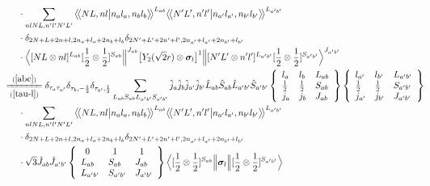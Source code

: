 \documentclass[master]{shnuthesis}
\newcommand{\llangle}{\big\langle\!\big\langle}
\newcommand{\rrangle}{\big\rangle\!\big\rangle}
\newcommand{\ap}{a^\prime}
\newcommand{\bp}{b^\prime}
\newcommand{\il}{\!\!\!\!\!\!\!\!\!\!}
\newcommand{\zdydh}{\xlongequal}
\begin{document}
\begin{align}
    & \cdot \sum_{nlNL,n^\prime l^\prime N^\prime L^\prime} \llangle N L, n l \big| n_{a} l_{a}, n_{b} l_{b} \rrangle^{L_{ab}} \llangle N^\prime L^\prime, n^\prime l^\prime \big| n_{a^\prime} l_{a^\prime}, n_{b^\prime} l_{b^\prime} \rrangle^{L_{\ap\bp}} \notag\\
    & \cdot \delta_{2N+L+2n+l,2n_a+l_a+2n_b+l_b}\delta_{2N^\prime+L^\prime+2n^\prime+l^\prime,2n_{a^\prime}+l_{a^\prime}+2n_{b^\prime}+l_{b^\prime}}  \notag\\
    & \cdot \Big\langle [N L \otimes n l]^{L_{ab}} [\frac{1}{2}\otimes\frac{1}{2}]^{S_{ab}} \Big\|^{J_{ab}} \big[Y_2(\sqrt{2}r) \otimes \bm{\sigma}_l\big]^1 \Big\| [N^\prime L^\prime \otimes n^\prime l^\prime]^{L_{\ap\bp}} [\frac{1}{2}\otimes\frac{1}{2}]^{S_{\ap\bp}} \Big\rangle^{J_{\ap \bp}} \\
    &\il \zdydh[(\ref{tau-l})]{(\ref{abc})} \delta_{\tau_a \tau_{\ap}}\delta_{\tau_b, -\frac{1}{2}}\delta_{\tau_{\bp}, \frac{1}{2}} \sum_{L_{ab}S_{ab}L_{\ap\bp}S_{\ap\bp}} \hat{j}_a\hat{j}_b\hat{j}_{\ap}\hat{j}_{\bp}\hat{L}_{ab}\hat{S}_{ab}\hat{L}_{\ap\bp}\hat{S}_{\ap\bp}  \left\{\begin{array}{lll}l_{a} & l_{b} & L_{ab} \\ \frac{1}{2} & \frac{1}{2} & S_{ab} \\j_{a} & j_{b} & J_{ab} \end{array}\right\} \left\{\begin{array}{lll}l_{\ap} & l_{\bp} & L_{\ap\bp} \\ \frac{1}{2} & \frac{1}{2} & S_{\ap\bp} \\j_{\ap} & j_{\bp} & J_{\ap\bp} \end{array}\right\}  \notag \\
    & \cdot \sum_{nlNL,n^\prime l^\prime N^\prime L^\prime} \llangle N L, n l \big| n_{a} l_{a}, n_{b} l_{b} \rrangle^{L_{ab}} \llangle N^\prime L^\prime, n^\prime l^\prime \big| n_{a^\prime} l_{a^\prime}, n_{b^\prime} l_{b^\prime} \rrangle^{L_{\ap\bp}} \notag\\
    & \cdot \delta_{2N+L+2n+l,2n_a+l_a+2n_b+l_b}\delta_{2N^\prime+L^\prime+2n^\prime+l^\prime,2n_{a^\prime}+l_{a^\prime}+2n_{b^\prime}+l_{b^\prime}}  \notag\\
    & \cdot \sqrt{3}\hat{J}_{ab}\hat{J}_{\ap\bp}  \left\{\begin{array}{lll} \,\,\,0 & \,\,\,1 & \,\,\,1 \\ L_{ab} & S_{ab} & J_{ab} \\ L_{\ap\bp} & S_{\ap\bp} & J_{\ap\bp} \end{array}\right\}  \Big\langle [\frac{1}{2}\otimes\frac{1}{2}]^{S_{ab}} \Big\| \bm{\sigma}_l \Big\| [\frac{1}{2}\otimes\frac{1}{2}]^{S_{\ap\bp}} \Big\rangle  \notag\\

\end{align}
\end{document}
